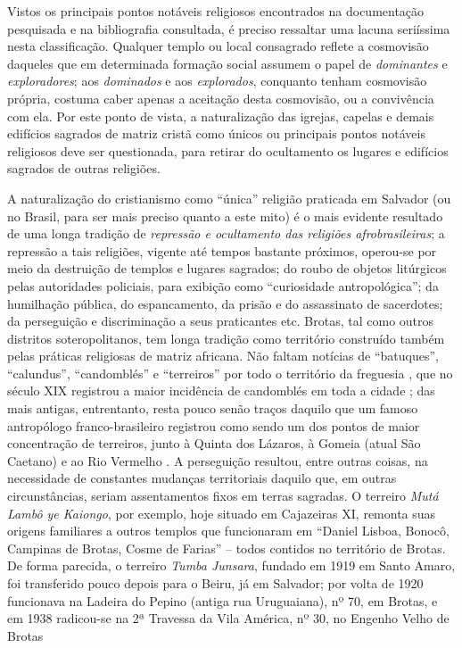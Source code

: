Vistos os principais pontos notáveis religiosos encontrados na documentação pesquisada e na bibliografia consultada, é preciso ressaltar uma lacuna seriíssima nesta classificação. Qualquer templo ou local consagrado reflete a cosmovisão daqueles que em determinada formação social assumem o papel de \textit{dominantes} e \textit{exploradores}; aos \textit{dominados} e aos \textit{explorados}, conquanto tenham cosmovisão própria, costuma caber apenas a aceitação desta cosmovisão, ou a convivência com ela. Por este ponto de vista, a naturalização das igrejas, capelas e demais edifícios sagrados de matriz cristã como únicos ou principais pontos notáveis religiosos deve ser questionada, para retirar do ocultamento os lugares e edifícios sagrados de outras religiões.

A naturalização do cristianismo como ``única'' religião praticada em Salvador (ou no Brasil, para ser mais preciso quanto a este mito) é o mais evidente resultado de uma longa tradição de \textit{repressão e ocultamento das religiões afrobrasileiras}; a repressão a tais religiões, vigente até tempos bastante próximos, operou-se por meio da destruição de templos e lugares sagrados; do roubo de objetos litúrgicos pelas autoridades policiais, para exibição como ``curiosidade antropológica''; da humilhação pública, do espancamento, da prisão e do assassinato de sacerdotes; da perseguição e discriminação a seus praticantes etc. Brotas, tal como outros distritos soteropolitanos, tem longa tradição como território construído também pelas práticas religiosas de matriz africana. Não faltam notícias de ``batuques'', ``calundus'', ``candomblés'' e ``terreiros'' por todo o território da freguesia \cite{carneiro_candomble_1954,reis_domingos_2008,REISSILVA1989}, que no século XIX registrou a maior incidência de candomblés em toda a cidade \cite[p.~60]{santana_itiner_2008}; das mais antigas, entrentanto, resta pouco senão traços daquilo que um famoso antropólogo franco-brasileiro registrou como sendo um dos pontos de maior concentração de terreiros, junto à Quinta dos Lázaros, à Gomeia (atual São Caetano) e ao Rio Vermelho \cite{bastide_mystique_1978}. A perseguição resultou, entre outras coisas, na necessidade de constantes mudanças territoriais daquilo que, em outras circunstâncias, seriam assentamentos fixos em terras sagradas. O terreiro \textit{Mutá Lambô ye Kaiongo}, por exemplo, hoje situado em Cajazeiras XI, remonta suas origens familiares a outros templos que funcionaram em ``Daniel Lisboa, Bonocô, Campinas de Brotas, Cosme de Farias'' \cite[p.~50]{alves_paquetan_2010} -- todos contidos no território de Brotas. De forma parecida, o terreiro \textit{Tumba Junsara}, fundado em 1919 em Santo Amaro, foi transferido pouco depois para o Beiru, já em Salvador; por volta de 1920 funcionava na Ladeira do Pepino (antiga rua Uruguaiana), nº 70, em Brotas, e em 1938 radicou-se na 2ª Travessa da Vila América, nº 30, no Engenho Velho de Brotas \cite[p.~61]{rego_terreiros_2006}

